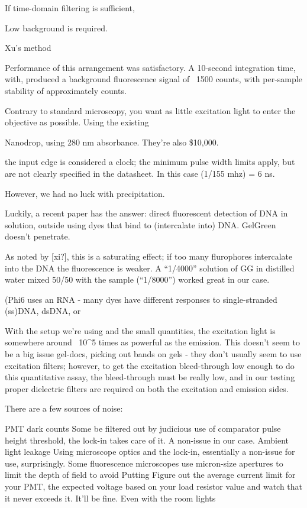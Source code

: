 \documentclass[paper.tex]{subfiles}
\begin{document}
If time-domain filtering is sufficient, 

Low background is required.

Xu's method \cite{Quantification2020}

Performance of this arrangement was satisfactory. A 10-second integration time, with, produced a background fluorescence signal of ~1500 counts, with per-sample stability of approximately  counts. 



Contrary to standard microscopy, you want as little excitation light to enter the objective as possible. Using the existing 



Nanodrop, using 280 nm absorbance. They're also \$10,000.




the input edge is considered a clock; the minimum pulse width limits apply, but are not clearly specified in the datasheet. In this case (1/155 mhz) = 6 ns.

However, we had no luck with precipitation.


Luckily, a recent paper has the answer: direct fluorescent detection of DNA in solution, outside using dyes that bind to (intercalate into) DNA. GelGreen doesn’t penetrate.



As noted by [xi?], this is a saturating effect; if too many flurophores intercalate into the DNA the fluorescence is weaker. A “1/4000” solution of GG in distilled water mixed 50/50 with the sample (“1/8000”) worked great in our case.

(Phi6 uses an RNA - many dyes have different responses to single-stranded (ss)DNA, dsDNA, or 





With the setup we’re using and the small quantities, the excitation light is somewhere around ~10^5 times as powerful as the emission. This doesn’t seem to be a big issue gel-docs, picking out bands on gels - they don’t usually seem to use excitation filters; however, to get the excitation bleed-through low enough to do this quantitative assay, the bleed-through must be really low, and in our testing proper dielectric filters are required on both the excitation and emission sides. 

There are a few sources of noise:

PMT dark counts
Some be filtered out by judicious use of comparator pulse height threshold, the lock-in takes care of it. A non-issue in our case.
Ambient light leakage
Using microscope optics and the lock-in, essentially a non-issue for use, surprisingly. Some fluorescence microscopes use micron-size apertures to limit the depth of field to avoid Putting 
Figure out the average current limit for your PMT, the expected voltage based on your load resistor value and watch that it never exceeds it. It’ll be fine. Even with the room lights
\end{document}
